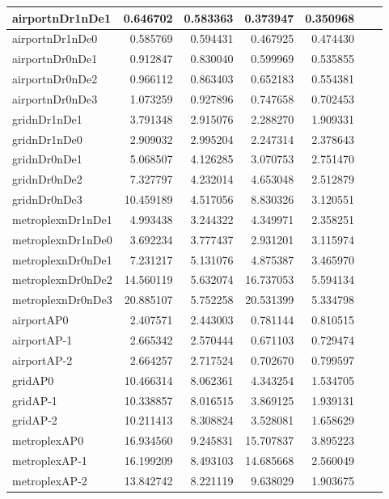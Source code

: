 \begin{longtable}{|l|r|r|r|r|r|r|}
\endlastfoot
airportnDr1nDe1 & 0.646702 & 0.583363 & 0.373947 & 0.350968 \\ \hline
airportnDr1nDe0 & 0.585769 & 0.594431 & 0.467925 & 0.474430 \\ \hline
airportnDr0nDe1 & 0.912847 & 0.830040 & 0.599969 & 0.535855 \\ \hline
airportnDr0nDe2 & 0.966112 & 0.863403 & 0.652183 & 0.554381 \\ \hline
airportnDr0nDe3 & 1.073259 & 0.927896 & 0.747658 & 0.702453 \\ \hline
gridnDr1nDe1 & 3.791348 & 2.915076 & 2.288270 & 1.909331 \\ \hline
gridnDr1nDe0 & 2.909032 & 2.995204 & 2.247314 & 2.378643 \\ \hline
gridnDr0nDe1 & 5.068507 & 4.126285 & 3.070753 & 2.751470 \\ \hline
gridnDr0nDe2 & 7.327797 & 4.232014 & 4.653048 & 2.512879 \\ \hline
gridnDr0nDe3 & 10.459189 & 4.517056 & 8.830326 & 3.120551 \\ \hline
metroplexnDr1nDe1 & 4.993438 & 3.244322 & 4.349971 & 2.358251 \\ \hline
metroplexnDr1nDe0 & 3.692234 & 3.777437 & 2.931201 & 3.115974 \\ \hline
metroplexnDr0nDe1 & 7.231217 & 5.131076 & 4.875387 & 3.465970 \\ \hline
metroplexnDr0nDe2 & 14.560119 & 5.632074 & 16.737053 & 5.594134 \\ \hline
metroplexnDr0nDe3 & 20.885107 & 5.752258 & 20.531399 & 5.334798 \\ \hline
airportAP0 & 2.407571 & 2.443003 & 0.781144 & 0.810515 \\ \hline
airportAP-1 & 2.665342 & 2.570444 & 0.671103 & 0.729474 \\ \hline
airportAP-2 & 2.664257 & 2.717524 & 0.702670 & 0.799597 \\ \hline
gridAP0 & 10.466314 & 8.062361 & 4.343254 & 1.534705 \\ \hline
gridAP-1 & 10.338857 & 8.016515 & 3.869125 & 1.939131 \\ \hline
gridAP-2 & 10.211413 & 8.308824 & 3.528081 & 1.658629 \\ \hline
metroplexAP0 & 16.934560 & 9.245831 & 15.707837 & 3.895223 \\ \hline
metroplexAP-1 & 16.199209 & 8.493103 & 14.685668 & 2.560049 \\ \hline
metroplexAP-2 & 13.842742 & 8.221119 & 9.638029 & 1.903675 \\ \hline

\end{longtable}
